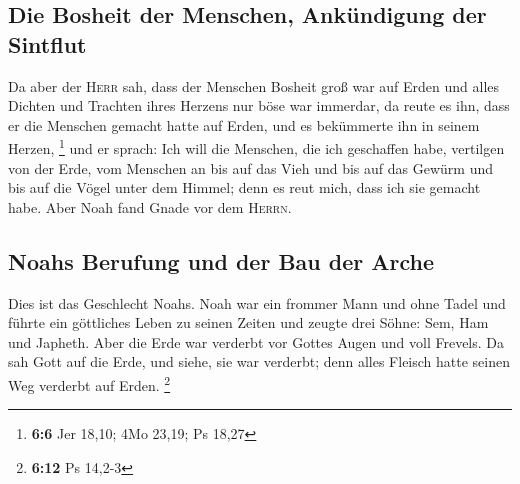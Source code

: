\hypertarget{die-bosheit-der-menschen-ankuxfcndigung-der-sintflut}{%
\subsection{Die Bosheit der Menschen, Ankündigung der
Sintflut}\label{die-bosheit-der-menschen-ankuxfcndigung-der-sintflut}}

 Da aber der \textsc{Herr} sah, dass der Menschen Bosheit
groß war auf Erden und alles Dichten und Trachten ihres Herzens nur böse
war immerdar,  da reute es ihn, dass er die Menschen
gemacht hatte auf Erden, und es bekümmerte ihn in seinem Herzen,
\footnote{\textbf{6:6} Jer 18,10; 4Mo 23,19; Ps 18,27} 
und er sprach: Ich will die Menschen, die ich geschaffen habe, vertilgen
von der Erde, vom Menschen an bis auf das Vieh und bis auf das Gewürm
und bis auf die Vögel unter dem Himmel; denn es reut mich, dass ich sie
gemacht habe.  Aber Noah fand Gnade vor dem
\textsc{Herrn}.

\hypertarget{noahs-berufung-und-der-bau-der-arche}{%
\subsection{Noahs Berufung und der Bau der
Arche}\label{noahs-berufung-und-der-bau-der-arche}}

 Dies ist das Geschlecht Noahs. Noah war ein frommer Mann
und ohne Tadel und führte ein göttliches Leben zu seinen Zeiten
 und zeugte drei Söhne: Sem, Ham und Japheth.
 Aber die Erde war verderbt vor Gottes Augen und voll
Frevels.  Da sah Gott auf die Erde, und siehe, sie war
verderbt; denn alles Fleisch hatte seinen Weg verderbt auf Erden.
\footnote{\textbf{6:12} Ps 14,2-3}

